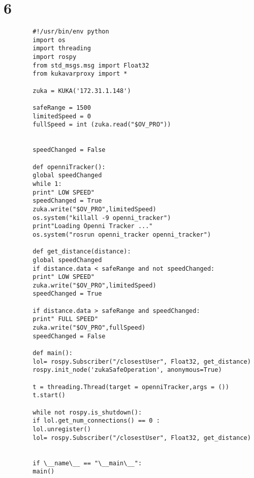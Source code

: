 \documentclass{book}
\begin{document}
	\section{6}
	\begin{verbatim}
		#!/usr/bin/env python
		import os
		import threading
		import rospy
		from std_msgs.msg import Float32
		from kukavarproxy import *
		
		zuka = KUKA('172.31.1.148')
		
		safeRange = 1500
		limitedSpeed = 0
		fullSpeed = int (zuka.read("$OV_PRO"))
		
		
		speedChanged = False
		
		def openniTracker():
		global speedChanged
		while 1:
		print" LOW SPEED"
		speedChanged = True
		zuka.write("$OV_PRO",limitedSpeed)
		os.system("killall -9 openni_tracker")
		print"Loading Openni Tracker ..."
		os.system("rosrun openni_tracker openni_tracker")
		
		def get_distance(distance):
		global speedChanged
		if distance.data < safeRange and not speedChanged:
		print" LOW SPEED"
		zuka.write("$OV_PRO",limitedSpeed)
		speedChanged = True
		
		if distance.data > safeRange and speedChanged:
		print" FULL SPEED"
		zuka.write("$OV_PRO",fullSpeed)
		speedChanged = False
		
		def main():	
		lol= rospy.Subscriber("/closestUser", Float32, get_distance)
		rospy.init_node('zukaSafeOperation', anonymous=True)
		
		t = threading.Thread(target = openniTracker,args = ())
		t.start()
		
		while not rospy.is_shutdown():
		if lol.get_num_connections() == 0 : 
		lol.unregister()
		lol= rospy.Subscriber("/closestUser", Float32, get_distance)
		
		
		if \__name\__ == "\__main\__":
		main()
	\end{verbatim}
\end{document}
